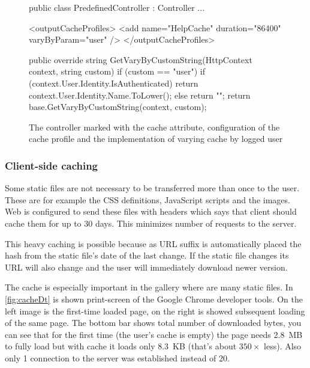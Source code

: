 \begin{figure}[h!]
	\begin{Csharp}
[OutputCache(CacheProfile = "HelpCache")]
public class PredefinedController : Controller { ... }
	\end{Csharp}

	\begin{XML}
<outputCacheProfiles>
	<add name="HelpCache" duration="86400" varyByParam="user" />
</outputCacheProfiles>
	\end{XML}

	\begin{Csharp}
public override string GetVaryByCustomString(HttpContext context, string custom) {
	if (custom == "user") {
		if (context.User.Identity.IsAuthenticated) {
			return context.User.Identity.Name.ToLower();
		}
		else {
			return "";
		}
	}
	return base.GetVaryByCustomString(context, custom);
}
	\end{Csharp}
	
	\caption[Example of the usage of cache]{The controller marked with the cache attribute, configuration of the cache profile and the implementation of varying cache by logged user}
	\label{fig:cache}
\end{figure}


\subsubsection{Client-side caching}

Some static files are not necessary to be transferred more than once to the user.
These are for example the CSS definitions, JavaScript scripts and the images.
Web is configured to send these files with headers which says that client should cache them for up to 30 days.
This minimizes number of requests to the server.

This heavy caching is possible because as URL suffix is automatically placed the hash from the static file's date of the last change.
If the static file changes its URL will also change and the user will immediately download newer version.

The cache is especially important in the gallery where are many static files.
In \autoref{fig:cacheDt} is shown print-screen of the Google Chrome developer tools.
On the left image is the first-time loaded page, on the right is showed subsequent loading of the same page.
The bottom bar shows total number of downloaded bytes, you can see that for the first time (the user's cache is empty) the page needs 2.8~MB to fully load but with cache it loads only 8.3~KB (that's about $350 \times$ less).
Also only 1 connection to the server was established instead of 20.

